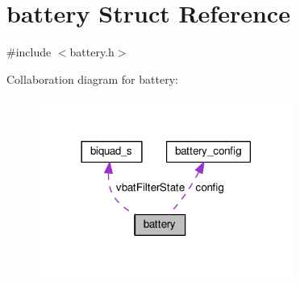 \hypertarget{structbattery}{\section{battery Struct Reference}
\label{structbattery}
}


{\ttfamily \#include $<$battery.\+h$>$}



Collaboration diagram for battery\+:\nopagebreak
\begin{figure}[H]
\begin{center}
\leavevmode
\includegraphics[width=237pt]{structbattery__coll__graph}
\end{center}
\end{figure}
